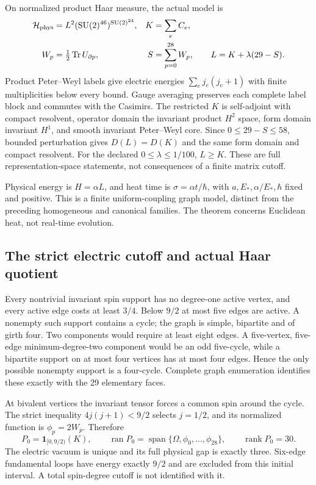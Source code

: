 On normalized product Haar measure, the actual model is
\begin{align}
 \mathcal H_{\rm phys}&=L^2(\mathrm{SU}(2)^{46})^{\mathrm{SU}(2)^{24}},
 &K&=\sum_e C_e,\notag\\
 W_p&=\tfrac12\operatorname{Tr}U_{\partial p},
 &S&=\sum_{p=0}^{28}W_p,\qquad L=K+\lambda(29-S).
 \label{r28:eq:ah1-model}
\end{align}
Product Peter--Weyl labels give electric energies $\sum_ej_e(j_e+1)$ with finite multiplicities below every bound. Gauge averaging preserves each complete label block and commutes with the Casimirs. The restricted $K$ is self-adjoint with compact resolvent, operator domain the invariant product $H^2$ space, form domain invariant $H^1$, and smooth invariant Peter--Weyl core. Since $0\le29-S\le58$, bounded perturbation gives $D(L)=D(K)$ and the same form domain and compact resolvent. For the declared $0\le\lambda\le1/100$, $L\ge K$. These are full representation-space statements, not consequences of a finite matrix cutoff.

Physical energy is $H=\alpha L$, and heat time is $\sigma=\alpha t/\hbar$, with $a,E_*,\alpha/E_*,\hbar$ fixed and positive. This is a finite uniform-coupling graph model, distinct from the preceding homogeneous and canonical families. The theorem concerns Euclidean heat, not real-time evolution.

\subsection{The strict electric cutoff and actual Haar quotient}
Every nontrivial invariant spin support has no degree-one active vertex, and every active edge costs at least $3/4$. Below $9/2$ at most five edges are active. A nonempty such support contains a cycle; the graph is simple, bipartite and of girth four. Two components would require at least eight edges. A five-vertex, five-edge minimum-degree-two component would be an odd five-cycle, while a bipartite support on at most four vertices has at most four edges. Hence the only possible nonempty support is a four-cycle. Complete graph enumeration identifies these exactly with the 29 elementary faces.

At bivalent vertices the invariant tensor forces a common spin around the cycle. The strict inequality $4j(j+1)<9/2$ selects $j=1/2$, and its normalized function is $\phi_p=2W_p$. Therefore
\begin{equation}
 P_0=\mathbf1_{[0,9/2)}(K),\qquad
 \operatorname{ran}P_0=\operatorname{span}\{\Omega,\phi_0,\ldots,\phi_{28}\},
 \qquad\operatorname{rank}P_0=30.
 \label{r28:eq:ah1-strict}
\end{equation}
The electric vacuum is unique and its full physical gap is exactly three. Six-edge fundamental loops have energy exactly $9/2$ and are excluded from this initial interval. A total spin-degree cutoff is not identified with it.

